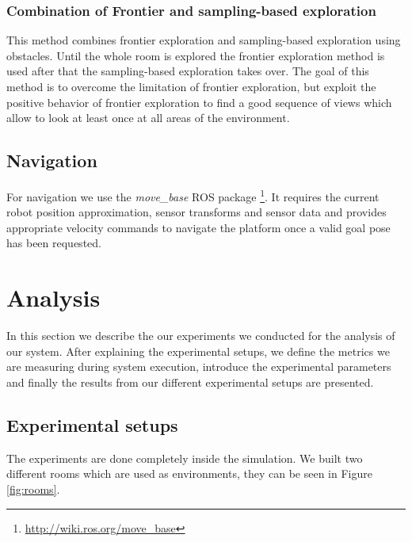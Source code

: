\documentclass[a4paper,11pt,english]{article}
\begin{document}
\subsubsection{Combination of Frontier and sampling-based exploration}
This method combines frontier exploration and sampling-based exploration using obstacles.
Until the whole room is explored the frontier exploration method is used after that the sampling-based exploration takes over. 
The goal of this method is to overcome the limitation of frontier exploration, but exploit the positive behavior of frontier exploration to find a good sequence of views which allow to look at least once at all areas of the environment.

\subsection{Navigation}
For navigation we use the \textit{move\_base} ROS package \footnote{\url{http://wiki.ros.org/move_base}}.
It requires the current robot position approximation, sensor transforms and sensor data and provides appropriate velocity commands to navigate the platform once a valid goal pose has been requested.

\section{Analysis}
\label{Analysis}
In this section we describe the our experiments we conducted for the analysis of our system.
After explaining the experimental setups, we define the metrics we are measuring during system execution, introduce the experimental parameters and finally the results from our different experimental setups are presented.

\subsection{Experimental setups}
The experiments are done completely inside the simulation.
We built two different rooms which are used as environments, they can be seen in Figure \ref{fig:rooms}.
\end{document}
